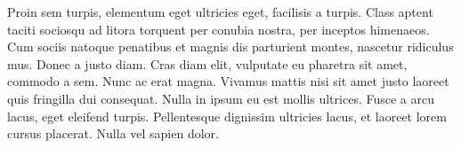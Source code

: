 Proin sem turpis, elementum eget ultricies eget, facilisis a turpis. Class
aptent taciti sociosqu ad litora torquent per conubia nostra, per inceptos
himenaeos. Cum sociis natoque penatibus et magnis dis parturient montes,
nascetur ridiculus mus. Donec a justo diam. Cras diam elit, vulputate eu
pharetra sit amet, commodo a sem. Nunc ac erat magna. Vivamus mattis nisi sit
amet justo laoreet quis fringilla dui consequat. Nulla in ipsum eu est mollis
ultrices. Fusce a arcu lacus, eget eleifend turpis. Pellentesque dignissim
ultricies lacus, et laoreet lorem cursus placerat. Nulla vel sapien dolor.
